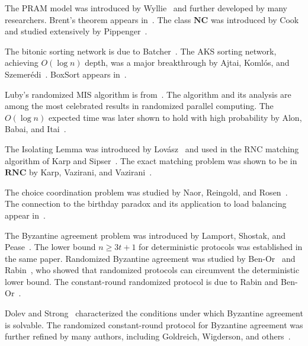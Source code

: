 \documentclass[twoside,12pt]{book}
\theoremstyle{plain}
\theoremstyle{definition}
\theoremstyle{remark}
\begin{document}
\begin{enumerate}[label={[\arabic*]}]
\item The PRAM model was introduced by Wyllie~\cite{wyllie1979complexity} and further developed by many researchers. Brent's theorem appears in~\cite{brent1974parallel}. The class $\mathbf{NC}$ was introduced by Cook~\cite{cook1983parallel} and studied extensively by Pippenger~\cite{pippenger1979parallel}.
\item The bitonic sorting network is due to Batcher~\cite{batcher1968sorting}. The AKS sorting network, achieving $O(\log n)$ depth, was a major breakthrough by Ajtai, Koml\'{o}s, and Szemer\'{e}di~\cite{ajtai1983sorting}. BoxSort appears in~\cite{leighton1992introduction}.
\item Luby's randomized MIS algorithm is from~\cite{luby1986simple}. The algorithm and its analysis are among the most celebrated results in randomized parallel computing. The $O(\log n)$ expected time was later shown to hold with high probability by Alon, Babai, and Itai~\cite{alon1986fast}.
\item The Isolating Lemma was introduced by Lov\'{a}sz~\cite{lovasz1979deterministic} and used in the RNC matching algorithm of Karp and Sipser~\cite{karp1981maximum}. The exact matching problem was shown to be in $\mathbf{RNC}$ by Karp, Vazirani, and Vazirani~\cite{karp1990randomized}.
\item The choice coordination problem was studied by Naor, Reingold, and Rosen~\cite{naor1999randomized}. The connection to the birthday paradox and its application to load balancing appear in~\cite{naor1995choice}.
\item The Byzantine agreement problem was introduced by Lamport, Shostak, and Pease~\cite{lamport1982byzantine}. The lower bound $n \geq 3t + 1$ for deterministic protocols was established in the same paper. Randomized Byzantine agreement was studied by Ben-Or~\cite{benor1983another} and Rabin~\cite{rabin1983randomized}, who showed that randomized protocols can circumvent the deterministic lower bound. The constant-round randomized protocol is due to Rabin and Ben-Or~\cite{rabin1983randomized}.
\item Dolev and Strong~\cite{dolev1983short} characterized the conditions under which Byzantine agreement is solvable. The randomized constant-round protocol for Byzantine agreement was further refined by many authors, including Goldreich, Wigderson, and others~\cite{goldreich1998how}.
\end{enumerate}
\end{document}

